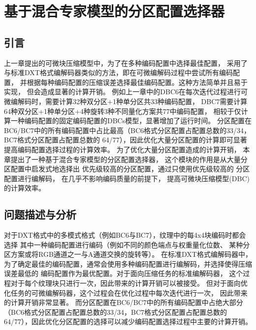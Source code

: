 
\chapter{基于混合专家模型的分区配置选择器}

\section{引言}

上一章提出的可微块压缩模型中，为了在多种编码配置中选择最佳配置，
采用了与标准DXT格式编解码器类似的方法，即在可微编解码过程中尝试所有编码配置，
并根据每种编码配置的压缩误差选择最佳编码配置。这种方法简单并且易于实现，
但会造成显著的计算开销。
例如上一章中的DBC6在每次迭代过程进行可微编解码时，需要计算32种双分区$+$1种单分区共33种编码配置，
DBC7需要计算64种双分区$+$1种单分区$+$4种旋转\times3种不同量化方案共77中编码配置，
相较于仅计算一种编码配置的固定编码配置的DBCs模型，显著增加了运行时间。
分区配置在BC6/BC7中的所有编码配置中占比最高（BC6格式分区配置占配置总数的33/34，BC7格式分区配置占配置总数的
64/77），因此优化大量分区配置的计算即可显著提高编码配置选择过程的计算效率。
为了优化大量分区配置造成的计算开销，
本章提出了一种基于混合专家模型的分区配置选择器，
这个模块的作用是从大量分区配置中启发式地选择出
优先级较高的分区配置，通过只使用优先级较高的
分区配置进行编解码，
在几乎不影响编码质量的前提下，
提高可微块压缩模型(DBC)的计算效率。

\section{问题描述与分析}

对于DXT格式中的多模式格式（例如BC6与BC7），纹理中的每4x4块编码时都会选择
其中一种编码配置进行编码（例如不同的颜色端点与权重量化位数、
某种分区方案或将RGB通道之一与A通道交换的旋转等）。
在标准DXT格式编解码器中，为了确定最佳的编码配置，通常会使用多种编码配置进行编解码，并选择使得压缩误差最低的
编码配置作为最优配置。对于面向压缩任务的标准编解码器，
这个过程对于每个纹理块只进行一次，因此带来的计算开销可以被接受。
但对于面向优化任务的可微编解码器，这个过程会在优化过程中每次迭代进行一次，
因此带来的计算开销非常显著。
而分区配置在BC6/BC7中的所有编码配置中占绝大部分（BC6格式分区配置占配置总数的33/34，BC7格式分区配置占配置总数的
64/77），因此优化分区配置的选择可以减少编码配置选择过程中主要的计算开销。

